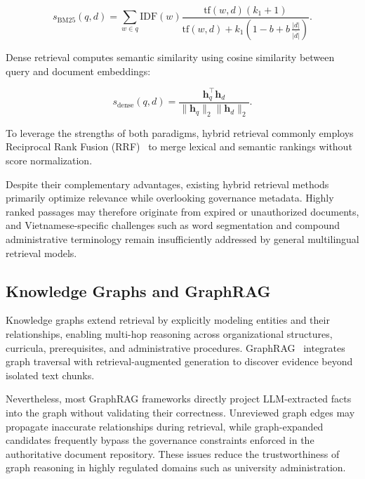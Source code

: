 \begin{equation}
  s_{\mathrm{BM25}}(q,d)
  =\sum_{w\in q}\mathrm{IDF}(w)
   \frac{\mathrm{tf}(w,d)(k_1+1)}
        {\mathrm{tf}(w,d)+k_1\!\left(1-b+b\,\tfrac{|d|}{\overline{|d|}}\right)}.
\label{eq:bm25}
\end{equation}

Dense retrieval computes semantic similarity using cosine similarity between query and document embeddings:

\begin{equation}
  s_{\mathrm{dense}}(q,d)
  =\frac{\mathbf{h}_q^\top\mathbf{h}_d}
        {\|\mathbf{h}_q\|_2\|\mathbf{h}_d\|_2}.
\label{eq:dense}
\end{equation}

To leverage the strengths of both paradigms, hybrid retrieval commonly employs Reciprocal Rank Fusion (RRF)~\cite{cormack2009rrf} to merge lexical and semantic rankings without score normalization.

Despite their complementary advantages, existing hybrid retrieval methods primarily optimize relevance while overlooking governance metadata. Highly ranked passages may therefore originate from expired or unauthorized documents, and Vietnamese-specific challenges such as word segmentation and compound administrative terminology remain insufficiently addressed by general multilingual retrieval models.

\subsection{Knowledge Graphs and GraphRAG}

Knowledge graphs extend retrieval by explicitly modeling entities and their relationships, enabling multi-hop reasoning across organizational structures, curricula, prerequisites, and administrative procedures. GraphRAG~\cite{edge2024graphrag} integrates graph traversal with retrieval-augmented generation to discover evidence beyond isolated text chunks.

Nevertheless, most GraphRAG frameworks directly project LLM-extracted facts into the graph without validating their correctness. Unreviewed graph edges may propagate inaccurate relationships during retrieval, while graph-expanded candidates frequently bypass the governance constraints enforced in the authoritative document repository. These issues reduce the trustworthiness of graph reasoning in highly regulated domains such as university administration.

